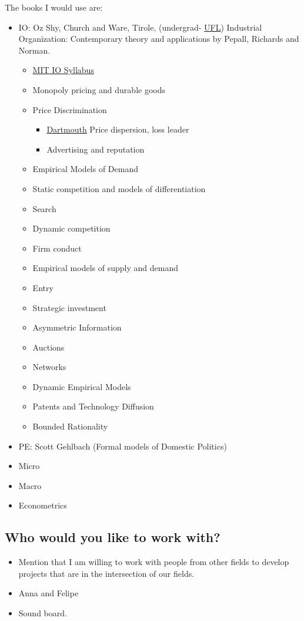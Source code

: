 \documentclass[12pt]{article}
\theoremstyle{plain}
\theoremstyle{plain}
\theoremstyle{plain}
\theoremstyle{plain}
\theoremstyle{plain}
\theoremstyle{plain}
\begin{document}
The books I would use are:
\begin{itemize}
\item IO: Oz Shy, Church and Ware, Tirole,
(undergrad- \href{http://sites.clas.ufl.edu/economics/files/ECP3403\_IndustrialOrg\_BET\_F18.pdf}{UFL}) Industrial Organization: Contemporary theory and applications by Pepall, Richards and Norman.
\begin{itemize}
\item \href{https://ocw.mit.edu/courses/economics/14-271-industrial-organization-i-fall-2005/syllabus/}{MIT IO Syllabus}
\item Monopoly pricing and durable goods
\item Price Discrimination
\begin{itemize}
\item \href{https://mansur.host.dartmouth.edu/classes/econ45.pdf}{Dartmouth} Price dispersion, loss leader
\item Advertising and reputation
\end{itemize}
\item Empirical Models of Demand
\item Static competition and models of differentiation
\item Search
\item Dynamic competition
\item Firm conduct
\item Empirical models of supply and demand
\item Entry
\item Strategic investment
\item Asymmetric Information
\item Auctions
\item Networks
\item Dynamic Empirical Models
\item Patents and Technology Diffusion
\item Bounded Rationality
\end{itemize}
\item PE: Scott Gehlbach (Formal models of Domestic Politics)
\item Micro
\item Macro
\item Econometrics
\end{itemize}



\subsection{Who would you like to work with?}
\label{sec:org0053891}
\begin{itemize}
\item Mention that I am willing to work with people from other fields to develop projects that are in the intersection of our fields.
\item Anna and Felipe
\item Sound board.
\end{itemize}
\end{document}
